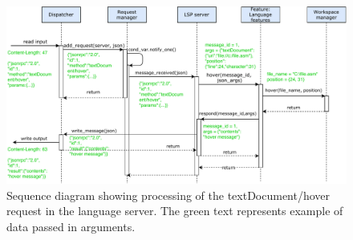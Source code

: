 \begin{landscape}
	\begin{figure}
		\centering
		\includegraphics[width=21cm]{img/hover_sequence}
		\caption{Sequence diagram showing processing of the textDocument/hover request in the language server. The green text represents example of data passed in arguments.}
		\label{hover_sequence}
	\end{figure}
\end{landscape}


